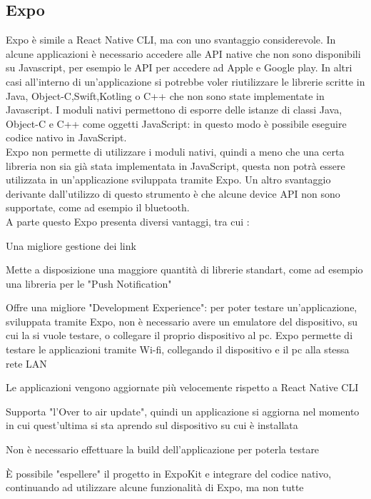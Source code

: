 \subsection{Expo}
Expo \`e simile a React Native CLI, ma con uno svantaggio considerevole. In alcune applicazioni \`e necessario
accedere alle API native che non sono disponibili su Javascript, per esempio le API per accedere ad Apple e Google play.
In altri casi all'interno di un'applicazione si
potrebbe voler riutilizzare le librerie scritte in Java, Object-C,Swift,Kotling o C++ che non sono state implementate in Javascript.
I moduli nativi permettono di esporre
delle istanze di classi Java, Object-C e C++ come oggetti JavaScript: in questo modo \`e possibile eseguire codice nativo in JavaScript.\\
Expo non permette di utilizzare i moduli nativi, quindi a meno che una certa libreria non sia gi\`a stata implementata in JavaScript, questa non potr\`a essere utilizzata
in un'applicazione sviluppata tramite Expo.
Un altro svantaggio derivante dall'utilizzo di questo strumento \`e che alcune device API non sono supportate, come ad esempio il bluetooth.\\
A parte questo Expo presenta diversi vantaggi, tra cui \cite{ReactNative:Sito} \cite{ReactNativeCLI:Expo}:
\begin{list}{*}{}
      \item Una migliore gestione dei link
      \item Mette a disposizione una maggiore quantit\`a di librerie standart, come ad esempio una libreria per le "Push Notification"
      \item Offre una migliore "Development Experience": per poter testare un'applicazione, sviluppata tramite Expo, non \`e necessario avere un emulatore del dispositivo, su cui la si vuole testare, o collegare il proprio dispositivo al pc.
            Expo permette di testare le applicazioni tramite Wi-fi, collegando il dispositivo e il pc alla stessa rete LAN
      \item Le applicazioni vengono aggiornate pi\`u velocemente rispetto a React Native CLI
      \item Supporta "l'Over to air update", quindi un applicazione si aggiorna nel momento in cui quest'ultima si sta aprendo sul dispositivo su cui \`e installata
      \item Non \`e necessario effettuare la build dell'applicazione per poterla testare
      \item \`E possibile "espellere" il progetto in ExpoKit e integrare del codice nativo, continuando ad utilizzare alcune funzionalit\`a di Expo, ma non tutte
\end{list}

